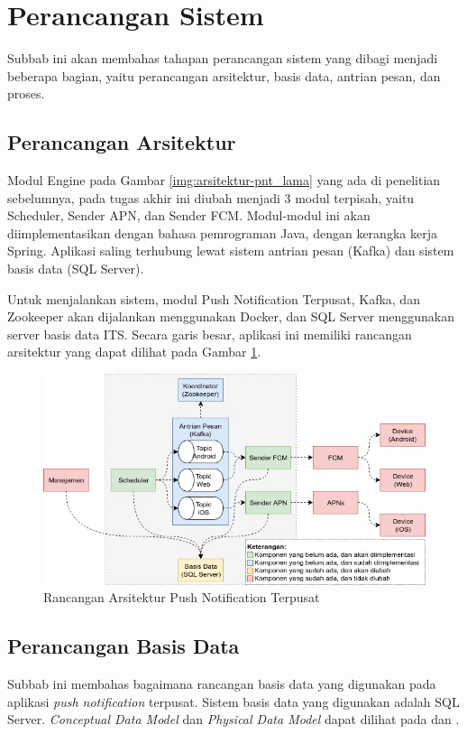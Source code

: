 \section{Perancangan Sistem}
\par Subbab ini akan membahas tahapan perancangan sistem yang dibagi menjadi beberapa bagian, yaitu perancangan arsitektur, basis data, antrian pesan, dan proses.

\subsection{Perancangan Arsitektur} \label{s:perancangan_arsitektur}
\par Modul Engine pada Gambar \ref{img:arsitektur-pnt_lama} yang ada di penelitian sebelumnya, pada tugas akhir ini diubah menjadi 3 modul terpisah, yaitu Scheduler, Sender APN, dan Sender FCM. Modul-modul ini akan diimplementasikan dengan bahasa pemrograman Java, dengan kerangka kerja Spring. Aplikasi saling terhubung lewat sistem antrian pesan (Kafka) dan sistem basis data (SQL Server).
\par Untuk menjalankan sistem, modul Push Notification Terpusat, Kafka, dan Zookeeper akan dijalankan menggunakan Docker, dan SQL Server menggunakan server basis data ITS. Secara garis besar, aplikasi ini memiliki rancangan arsitektur yang dapat dilihat pada Gambar \ref{img:arsitektur_baru}.
\begin{figure}[H]
    \includegraphics[width=1\textwidth]{bab3/img/arsitektur-push_notification_terpusat_baru.jpg}
    \caption{Rancangan Arsitektur Push Notification Terpusat} \label{img:arsitektur_baru}
\end{figure}

\subsection{Perancangan Basis Data}
\par Subbab ini membahas bagaimana rancangan basis data yang digunakan pada aplikasi \textit{push notification} terpusat. Sistem basis data yang digunakan adalah SQL Server. \textit{Conceptual Data Model} dan \textit{Physical Data Model} dapat dilihat pada  dan .

